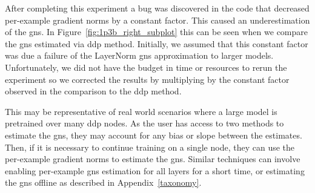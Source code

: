 \documentclass{article}
\begin{document}
After completing this experiment a bug was discovered in the code that decreased
per-example gradient norms by a constant factor. This caused an underestimation
of the \ac{gns}. In Figure~\ref{fig:1p3b_right_subplot} this can be seen when we
compare the \ac{gns} estimated via \ac{ddp} method. Initially, we assumed that
this constant factor was due a failure of the LayerNorm \ac{gns} approximation
to larger models. Unfortunately, we did not have the budget in time or resources
to rerun the experiment so we corrected the results by multiplying by the
constant factor observed in the comparison to the \ac{ddp} method.

This may be representative of real world scenarios where a large model is
pretrained over many \ac{ddp} nodes. As the user has access to two methods to
estimate the \ac{gns}, they may account for any bias or slope between the estimates.
Then, if it is necessary to continue training on a single node, they can use
the per-example gradient norms to estimate the \ac{gns}. Similar techniques can
involve enabling per-example \ac{gns} estimation for all layers for a short
time, or estimating the \ac{gns} offline as described in
Appendix~\ref{taxonomy}.
\end{document}
